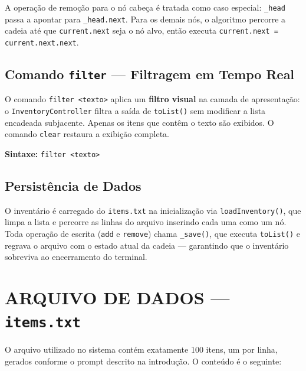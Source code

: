 \documentclass[12pt,a4paper]{article}
\begin{document}
A operação de remoção para o nó cabeça é tratada como caso especial: \texttt{\_head} passa a apontar para \texttt{\_head.next}. Para os demais nós, o algoritmo percorre a cadeia até que \texttt{current.next} seja o nó alvo, então executa \texttt{current.next = current.next.next}.

\subsection{Comando \texttt{filter} — Filtragem em Tempo Real}

O comando \texttt{filter <texto>} aplica um \textbf{filtro visual} na camada de apresentação: o \texttt{InventoryController} filtra a saída de \texttt{toList()} sem modificar a lista encadeada subjacente. Apenas os itens que contêm o texto são exibidos. O comando \texttt{clear} restaura a exibição completa.

\textbf{Sintaxe:} \texttt{filter <texto>}

\subsection{Persistência de Dados}

O inventário é carregado do \texttt{items.txt} na inicialização via \texttt{loadInventory()}, que limpa a lista e percorre as linhas do arquivo inserindo cada uma como um nó. Toda operação de escrita (\texttt{add} e \texttt{remove}) chama \texttt{\_save()}, que executa \texttt{toList()} e regrava o arquivo com o estado atual da cadeia — garantindo que o inventário sobreviva ao encerramento do terminal.

\section{ARQUIVO DE DADOS — \texttt{items.txt}}

O arquivo utilizado no sistema contém exatamente 100 itens, um por linha, gerados conforme o prompt descrito na introdução. O conteúdo é o seguinte:
\end{document}

